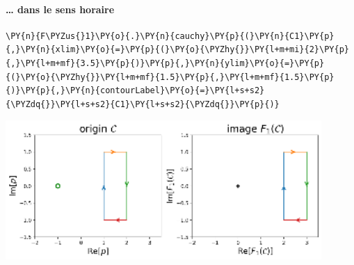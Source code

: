 \paragraph{\ldots{} dans le sens horaire\label{dans-le-sens-horaire}}
\begin{tcolorbox}[breakable, size=fbox, boxrule=1pt, pad at break*=1mm,colback=cellbackground, colframe=cellborder]
\begin{Verbatim}[commandchars=\\\{\}]
\PY{n}{F\PYZus{}1}\PY{o}{.}\PY{n}{cauchy}\PY{p}{(}\PY{n}{C1}\PY{p}{,}\PY{n}{xlim}\PY{o}{=}\PY{p}{(}\PY{o}{\PYZhy{}}\PY{l+m+mi}{2}\PY{p}{,}\PY{l+m+mf}{3.5}\PY{p}{)}\PY{p}{,}\PY{n}{ylim}\PY{o}{=}\PY{p}{(}\PY{o}{\PYZhy{}}\PY{l+m+mf}{1.5}\PY{p}{,}\PY{l+m+mf}{1.5}\PY{p}{)}\PY{p}{,}\PY{n}{contourLabel}\PY{o}{=}\PY{l+s+s2}{\PYZdq{}}\PY{l+s+s2}{C1}\PY{l+s+s2}{\PYZdq{}}\PY{p}{)}
\end{Verbatim}
\end{tcolorbox}
\begin{center}
    \includegraphics[width=0.9\textwidth]{notebook/fig/output_15_1.eps}
\end{center}
